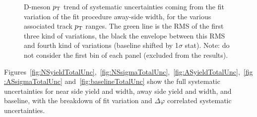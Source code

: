 \begin{figure}[!htbp]
\caption{D-meson $p_{\rm T}$ trend of systematic uncertainties coming from the fit variation of the fit procedure away-side width, for the various associated track $p_{\rm T}$ ranges. The green line is the RMS of the first three kind of variations, the black the envelope between this RMS and fourth kind of variations (baseline shifted by 1$\sigma$ stat). Note: do not consider the first bin of each panel (excluded from the results).}
\label{fig:ASsigmaUnc}
\end{figure}

\clearpage

Figures~\ref{fig:NSyieldTotalUnc},~\ref{fig:NSsigmaTotalUnc},~\ref{fig:ASyieldTotalUnc},~\ref{fig:ASsigmaTotalUnc} and~\ref{fig:baselineTotalUnc} show the full systematic uncertainties for near side yield and width, away side yield and width, and baseline, with the breakdown of fit variation and $\Delta\varphi$ correlated systematic uncertainties.

